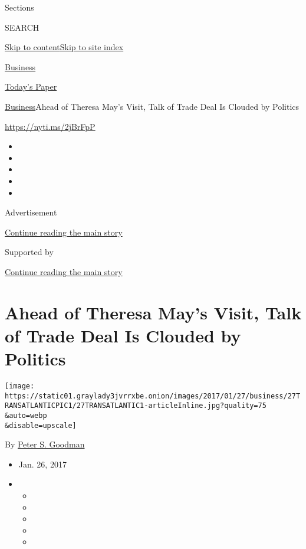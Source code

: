 Sections

SEARCH

\protect\hyperlink{site-content}{Skip to
content}\protect\hyperlink{site-index}{Skip to site index}

\href{https://www.nytimes3xbfgragh.onion/section/business}{Business}

\href{https://myaccount.nytimes3xbfgragh.onion/auth/login?response_type=cookie\&client_id=vi}{}

\href{https://www.nytimes3xbfgragh.onion/section/todayspaper}{Today's
Paper}

\href{/section/business}{Business}\textbar{}Ahead of Theresa May's
Visit, Talk of Trade Deal Is Clouded by Politics

\url{https://nyti.ms/2jBrFpP}

\begin{itemize}
\item
\item
\item
\item
\item
\end{itemize}

Advertisement

\protect\hyperlink{after-top}{Continue reading the main story}

Supported by

\protect\hyperlink{after-sponsor}{Continue reading the main story}

\hypertarget{ahead-of-theresa-mays-visit-talk-of-trade-deal-is-clouded-by-politics}{%
\section{Ahead of Theresa May's Visit, Talk of Trade Deal Is Clouded by
Politics}\label{ahead-of-theresa-mays-visit-talk-of-trade-deal-is-clouded-by-politics}}

\texttt{[image: https://static01.graylady3jvrrxbe.onion/images/2017/01/27/business/27TRANSATLANTICPIC1/27TRANSATLANTIC1-articleInline.jpg?quality=75\\\&auto=webp\\\&disable=upscale]}

By \href{http://www.nytimes3xbfgragh.onion/by/peter-s-goodman}{Peter S.
Goodman}

\begin{itemize}
\item
  Jan. 26, 2017
\item
  \begin{itemize}
  \item
  \item
  \item
  \item
  \item
  \end{itemize}
\end{itemize}

